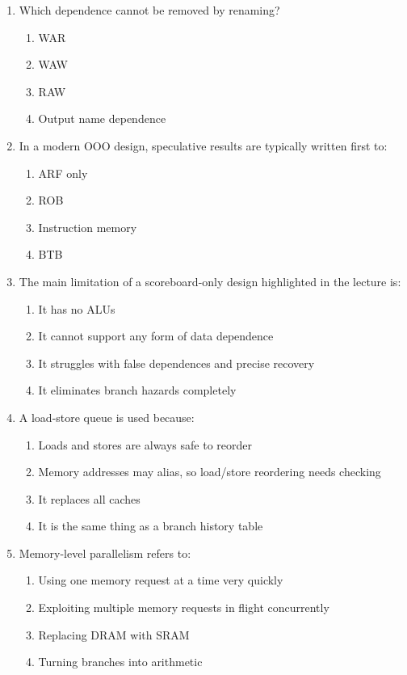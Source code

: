 \documentclass[11pt]{article}
\begin{document}
\begin{enumerate}[label=\textbf{A\arabic*.}]
  \item Which dependence cannot be removed by renaming?
  \begin{enumerate}[label=(\Alph*)]
    \item WAR
    \item WAW
    \item RAW
    \item Output name dependence
  \end{enumerate}

  \item In a modern OOO design, speculative results are typically written first to:
  \begin{enumerate}[label=(\Alph*)]
    \item ARF only
    \item ROB
    \item Instruction memory
    \item BTB
  \end{enumerate}

  \item The main limitation of a scoreboard-only design highlighted in the lecture is:
  \begin{enumerate}[label=(\Alph*)]
    \item It has no ALUs
    \item It cannot support any form of data dependence
    \item It struggles with false dependences and precise recovery
    \item It eliminates branch hazards completely
  \end{enumerate}

  \item A load-store queue is used because:
  \begin{enumerate}[label=(\Alph*)]
    \item Loads and stores are always safe to reorder
    \item Memory addresses may alias, so load/store reordering needs checking
    \item It replaces all caches
    \item It is the same thing as a branch history table
  \end{enumerate}

  \item Memory-level parallelism refers to:
  \begin{enumerate}[label=(\Alph*)]
    \item Using one memory request at a time very quickly
    \item Exploiting multiple memory requests in flight concurrently
    \item Replacing DRAM with SRAM
    \item Turning branches into arithmetic
  \end{enumerate}
\end{enumerate}
\end{document}
